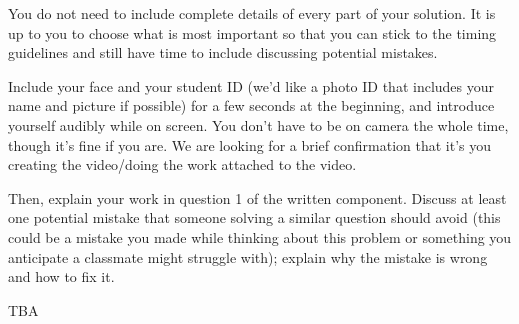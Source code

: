 \documentclass[12pt, oneside]{article}
\begin{document}
You do not need to include complete details of every part of your solution. 
It is up to you to choose what is most important so that you can stick to the 
timing guidelines and still have time to include discussing potential mistakes.

Include your face and your student ID (we'd like a photo ID that includes your name 
and picture if possible) for a few seconds at the beginning, and introduce yourself 
audibly while on screen. You don't have to be on camera the whole time, though it's fine 
if you are. We are looking for a brief confirmation that it's you creating the 
video/doing the work attached to the video.


Then, explain your work in question 1 of the written component.
Discuss at least one potential mistake that someone solving 
a similar question should avoid (this could be a mistake you made while thinking about this 
problem or something you anticipate a classmate might struggle with); explain why the 
mistake is wrong and how to fix it.
 
TBA
\end{document}
